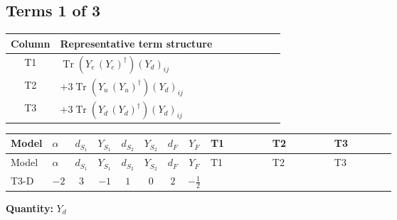 \documentclass[8pt]{article}
\begin{document}
\begin{landscape}
\subsection*{Terms 1 of 3}
\begin{center}
\begin{tabular}{@{}c >{\raggedright\arraybackslash}p{0.82\linewidth}@{}}
\toprule
Column & Representative term structure \\
\midrule
T1 & \(\displaystyle \operatorname{Tr}\!\left({Y_e}\,\left({Y_e}\right)^{\dagger}\right) \left({Y_d}\right)_{ij}\) \\
\midrule
T2 & \(\displaystyle +3 \operatorname{Tr}\!\left({Y_u}\,\left({Y_u}\right)^{\dagger}\right) \left({Y_d}\right)_{ij}\) \\
\midrule
T3 & \(\displaystyle +3 \operatorname{Tr}\!\left({Y_d}\,\left({Y_d}\right)^{\dagger}\right) \left({Y_d}\right)_{ij}\) \\
\midrule
\bottomrule
\end{tabular}
\end{center}
\smallskip
\tiny
\begin{longtable}{@{}llcccccc >{\raggedright\arraybackslash}p{0.21\linewidth} >{\raggedright\arraybackslash}p{0.21\linewidth} >{\raggedright\arraybackslash}p{0.21\linewidth}@{}}
\toprule
Model & $\alpha$ & $d_{S_1}$ & $Y_{S_1}$ & $d_{S_2}$ & $Y_{S_2}$ & $d_F$ & $Y_F$ & T1 & T2 & T3 \\
\midrule
\endfirsthead
\toprule
Model & $\alpha$ & $d_{S_1}$ & $Y_{S_1}$ & $d_{S_2}$ & $Y_{S_2}$ & $d_F$ & $Y_F$ & T1 & T2 & T3 \\
\midrule
\endhead
T3-D & $-2$ & $3$ & $-1$ & $1$ & $0$ & $2$ & $-\frac{1}{2}$ & \scriptsize\adjustbox{max width=\linewidth}{$\begin{gathered} \operatorname{Tr}\!\left({Y_e}\,\left({Y_e}\right)^{\dagger}\right) \left({Y_d}\right)_{ij}\end{gathered}$} & \scriptsize\adjustbox{max width=\linewidth}{$\begin{gathered} +3 \operatorname{Tr}\!\left({Y_u}\,\left({Y_u}\right)^{\dagger}\right) \left({Y_d}\right)_{ij}\end{gathered}$} & \scriptsize\adjustbox{max width=\linewidth}{$\begin{gathered} +3 \operatorname{Tr}\!\left({Y_d}\,\left({Y_d}\right)^{\dagger}\right) \left({Y_d}\right)_{ij}\end{gathered}$} \\
\midrule
\bottomrule
\end{longtable}
\clearpage
\noindent\textbf{Quantity: }$Y_d$\par\smallskip

\end{landscape}
\end{document}
